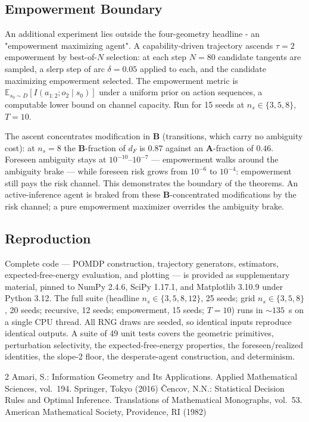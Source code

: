 \documentclass[runningheads]{llncs}
\begin{document}
\subsection{Empowerment Boundary}\label{app:empowerment}
 
An additional experiment lies outside the four-geometry headline - an "empowerment maximizing agent". A capability-driven
trajectory ascends $\tau = 2$ empowerment by best-of-$N$ selection: at
each step $N = 80$ candidate tangents are sampled, a slerp step of arc
$\delta = 0.05$ applied to each, and the candidate maximizing empowerment
selected. The empowerment metric is $\mathbb{E}_{s_0 \sim D}[I(a_{1:2};
o_2 \mid s_0)]$ under a uniform prior on action sequences, a computable
lower bound on channel capacity. Run for 15 seeds at $n_s \in \{3, 5,
8\}$, $T = 10$.
 
The ascent concentrates modification in $\mathbf{B}$ (transitions, which
carry no ambiguity cost): at $n_s = 8$ the $\mathbf{B}$-fraction of $d_F$
is $0.87$ against an $\mathbf{A}$-fraction of $0.46$. Foreseen ambiguity
stays at $10^{-10}$--$10^{-7}$ --- empowerment walks around the ambiguity
brake --- while foreseen risk grows from $10^{-6}$ to $10^{-4}$:
empowerment still pays the risk channel. This demonstrates the boundary of the
theorems. An active-inference agent is braked from these
$\mathbf{B}$-concentrated modifications by the risk channel; a pure
empowerment maximizer overrides the ambiguity brake.
 
\subsection{Reproduction}\label{app:reproduce}
 
Complete code --- POMDP construction, trajectory generators, estimators,
expected-free-energy evaluation, and plotting --- is provided as
supplementary material, pinned to NumPy 2.4.6, SciPy 1.17.1, and
Matplotlib 3.10.9 under Python 3.12. The full suite (headline
$n_s\in\{3,5,8,12\}$, 25 seeds; grid $n_s\in\{3,5,8\}$, 20 seeds;
recursive, 12 seeds; empowerment, 15 seeds; $T = 10$) runs in
$\sim\!135$~s on a single CPU thread. All RNG draws are seeded, so
identical inputs reproduce identical outputs. A suite of 49 unit tests
covers the geometric primitives, perturbation selectivity, the
expected-free-energy properties, the foreseen/realized identities, the
slope-2 floor, the desperate-agent construction, and determinism.

\begin{thebibliography}{2}
Amari, S.: Information Geometry and Its Applications. Applied Mathematical Sciences, vol.~194. Springer, Tokyo (2016)
{\v C}encov, N.N.: Statistical Decision Rules and Optimal Inference. Translations of Mathematical Monographs, vol.~53. American Mathematical Society, Providence, RI (1982)
\end{thebibliography}
\end{document}
